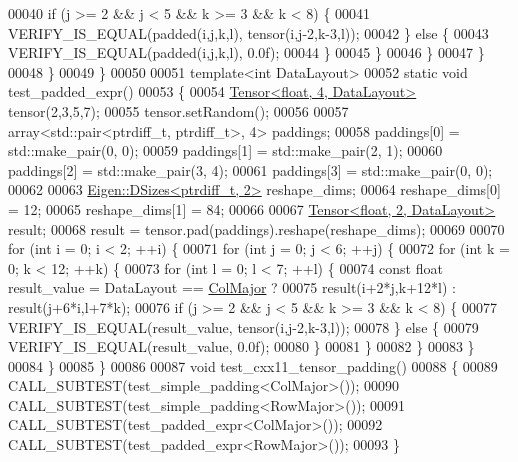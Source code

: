 \begin{DoxyCode}
00040           \textcolor{keywordflow}{if} (j >= 2 && j < 5 && k >= 3 && k < 8) \{
00041             VERIFY\_IS\_EQUAL(padded(i,j,k,l), tensor(i,j-2,k-3,l));
00042           \} \textcolor{keywordflow}{else} \{
00043             VERIFY\_IS\_EQUAL(padded(i,j,k,l), 0.0f);
00044           \}
00045         \}
00046       \}
00047     \}
00048   \}
00049 \}
00050 
00051 \textcolor{keyword}{template}<\textcolor{keywordtype}{int} DataLayout>
00052 \textcolor{keyword}{static} \textcolor{keywordtype}{void} test\_padded\_expr()
00053 \{
00054   \hyperlink{class_eigen_1_1_tensor}{Tensor<float, 4, DataLayout>} tensor(2,3,5,7);
00055   tensor.setRandom();
00056 
00057   array<std::pair<ptrdiff\_t, ptrdiff\_t>, 4> paddings;
00058   paddings[0] = std::make\_pair(0, 0);
00059   paddings[1] = std::make\_pair(2, 1);
00060   paddings[2] = std::make\_pair(3, 4);
00061   paddings[3] = std::make\_pair(0, 0);
00062 
00063   \hyperlink{struct_eigen_1_1_d_sizes}{Eigen::DSizes<ptrdiff\_t, 2>} reshape\_dims;
00064   reshape\_dims[0] = 12;
00065   reshape\_dims[1] = 84;
00066 
00067   \hyperlink{class_eigen_1_1_tensor}{Tensor<float, 2, DataLayout>} result;
00068   result = tensor.pad(paddings).reshape(reshape\_dims);
00069 
00070   \textcolor{keywordflow}{for} (\textcolor{keywordtype}{int} i = 0; i < 2; ++i) \{
00071     \textcolor{keywordflow}{for} (\textcolor{keywordtype}{int} j = 0; j < 6; ++j) \{
00072       \textcolor{keywordflow}{for} (\textcolor{keywordtype}{int} k = 0; k < 12; ++k) \{
00073         \textcolor{keywordflow}{for} (\textcolor{keywordtype}{int} l = 0; l < 7; ++l) \{
00074           \textcolor{keyword}{const} \textcolor{keywordtype}{float} result\_value = DataLayout == \hyperlink{group__enums_ggaacded1a18ae58b0f554751f6cdf9eb13a0cbd4bdd0abcfc0224c5fcb5e4f6669a}{ColMajor} ?
00075               result(i+2*j,k+12*l) : result(j+6*i,l+7*k);
00076           \textcolor{keywordflow}{if} (j >= 2 && j < 5 && k >= 3 && k < 8) \{
00077             VERIFY\_IS\_EQUAL(result\_value, tensor(i,j-2,k-3,l));
00078           \} \textcolor{keywordflow}{else} \{
00079             VERIFY\_IS\_EQUAL(result\_value, 0.0f);
00080           \}
00081         \}
00082       \}
00083     \}
00084   \}
00085 \}
00086 
00087 \textcolor{keywordtype}{void} test\_cxx11\_tensor\_padding()
00088 \{
00089   CALL\_SUBTEST(test\_simple\_padding<ColMajor>());
00090   CALL\_SUBTEST(test\_simple\_padding<RowMajor>());
00091   CALL\_SUBTEST(test\_padded\_expr<ColMajor>());
00092   CALL\_SUBTEST(test\_padded\_expr<RowMajor>());
00093 \}
\end{DoxyCode}
